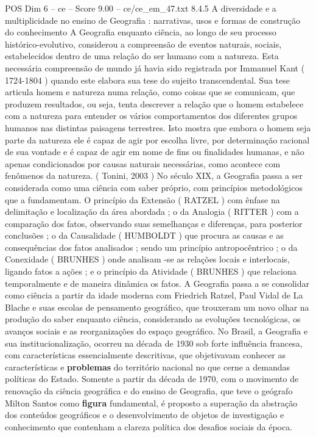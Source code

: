 \begin{textsample}{POS Dim 6 – ce – Score 9.00 – ce/ce\_em\_47.txt}  \label{ex:f6_pos_039}
8.4.5 A diversidade e a multiplicidade no ensino de Geografia : narrativas, usos e formas de construção do conhecimento A Geografia enquanto ciência, ao longo de seu processo histórico-evolutivo, considerou a compreensão de eventos naturais, sociais, estabelecidos dentro de uma relação do ser humano com a natureza.
Esta necessária compreensão de mundo já havia sido registrada por Immanuel Kant ( 1724-1804 ) quando este elabora sua tese do sujeito transcendental.
Sua tese articula homem e natureza numa relação, como coisas que se comunicam, que produzem resultados, ou seja, tenta descrever a relação que o homem estabelece com a natureza para entender os vários comportamentos dos diferentes grupos humanos nas distintas paisagens terrestres.
Isto mostra que embora o homem seja parte da natureza ele é capaz de agir por escolha livre, por determinação racional de sua vontade e é capaz de agir em nome de fins ou finalidades humanas, e não apenas condicionados por causas naturais necessárias, como acontece com fenômenos da natureza. ( Tonini, 2003 ) No século XIX, a Geografia passa a ser considerada como uma ciência com saber próprio, com princípios metodológicos que a fundamentam.
O princípio da Extensão ( RATZEL ) com ênfase na delimitação e localização da área abordada ; o da Analogia ( RITTER ) com a comparação dos fatos, observando suas semelhanças e diferenças, para posterior conclusões ; o da Causalidade ( HUMBOLDT ) que procura as causas e as consequências dos fatos analisados ; sendo um princípio antropocêntrico ; o da Conexidade ( BRUNHES ) onde analisam -se as relações locais e interlocais, ligando fatos a ações ; e o princípio da Atividade ( BRUNHES ) que relaciona temporalmente e de maneira dinâmica os fatos.
A Geografia passa a se consolidar como ciência a partir da idade moderna com Friedrich Ratzel, Paul Vidal de La Blache e suas escolas de pensamento geográfico, que trouxeram um novo olhar na produção do saber enquanto ciência, considerando as evoluções tecnológicas, os avanços sociais e as reorganizações do espaço geográfico.
No Brasil, a Geografia e sua institucionalização, ocorreu na década de 1930 sob forte influência francesa, com características essencialmente descritivas, que objetivavam conhecer as características e \textbf{problemas} do território nacional no que cerne a demandas políticas do Estado.
Somente a partir da década de 1970, com o movimento de renovação da ciência geográfica e do ensino de Geografia, que teve o geógrafo Milton Santos como \textbf{figura} fundamental, é proposto a superação da abstração dos conteúdos geográficos e o desenvolvimento de objetos de investigação e conhecimento que contenham a clareza política dos desafios sociais da época.

\end{textsample}
